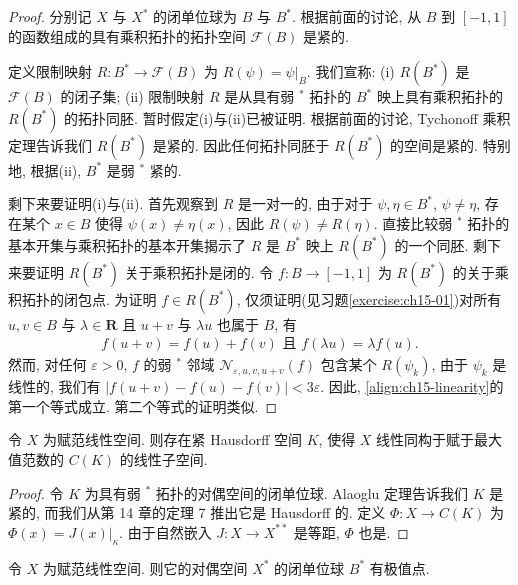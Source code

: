 \documentclass[../../main.tex]{subfiles}
\begin{document}
\begin{proof}
分别记 $X$ 与 $X^{*}$ 的闭单位球为 $B$ 与 $B^{*}$. 根据前面的讨论, 从 $B$ 到 $[-1,1]$ 的函数组成的具有乘积拓扑的拓扑空间 $\mathcal{F}(B)$ 是紧的.

定义限制映射 $R:B^{*}\to\mathcal{F}(B)$ 为 $R(\psi)=\psi|_{B}$. 我们宣称: (i) $R(B^{*})$ 是 $\mathcal{F}(B)$ 的闭子集; (ii) 限制映射 $R$ 是从具有弱 $^{*}$ 拓扑的 $B^{*}$ 映上具有乘积拓扑的 $R(B^{*})$ 的拓扑同胚. 暂时假定(i)与(ii)已被证明. 根据前面的讨论, Tychonoff 乘积定理告诉我们 $R(B^{*})$ 是紧的. 因此任何拓扑同胚于 $R(B^{*})$ 的空间是紧的. 特别地, 根据(ii), $B^{*}$ 是弱 $^{*}$ 紧的.

剩下来要证明(i)与(ii). 首先观察到 $R$ 是一对一的, 由于对于 $\psi,\eta\in B^{*}$, $\psi\neq\eta$, 存在某个 $x\in B$ 使得 $\psi(x)\neq\eta(x)$, 因此 $R(\psi)\neq R(\eta)$. 直接比较弱 $^{*}$ 拓扑的基本开集与乘积拓扑的基本开集揭示了 $R$ 是 $B^{*}$ 映上 $R(B^{*})$ 的一个同胚. 剩下来要证明 $R(B^{*})$ 关于乘积拓扑是闭的. 令 $f:B\to[-1,1]$ 为 $R(B^{*})$ 的关于乘积拓扑的闭包点. 为证明 $f\in R(B^{*})$, 仅须证明(见习题\cref{exercise:ch15-01})对所有 $u,v\in B$ 与 $\lambda\in\mathbf{R}$ 且 $u+v$ 与 $\lambda u$ 也属于 $B$, 有
\begin{align}
f(u+v)=f(u)+f(v)\text{ 且 }f(\lambda u)=\lambda f(u).\label{align:ch15-linearity}
\end{align}
然而, 对任何 $\varepsilon>0$, $f$ 的弱 $^{*}$ 邻域 $\mathcal{N}_{\varepsilon,u,v,u+v}(f)$ 包含某个 $R(\psi_{k})$, 由于 $\psi_{k}$ 是线性的, 我们有 $|f(u+v)-f(u)-f(v)|<3\varepsilon$. 因此, \eqref{align:ch15-linearity}的第一个等式成立. 第二个等式的证明类似.
\end{proof}

\begin{corollary}\label{corollary:ch15-compact-K}
令 $X$ 为赋范线性空间. 则存在紧 Hausdorff 空间 $K$, 使得 $X$ 线性同构于赋于最大值范数的 $C(K)$ 的线性子空间.
\end{corollary}

\begin{proof}
令 $K$ 为具有弱 $^{*}$ 拓扑的对偶空间的闭单位球. Alaoglu 定理告诉我们 $K$ 是紧的, 而我们从第 14 章的定理 7 推出它是 Hausdorff 的. 定义 $\Phi:X\to C(K)$ 为 $\Phi(x)=J(x)|_{\kappa}$. 由于自然嵌入 $J:X\to X^{**}$ 是等距, $\Phi$ 也是.
\end{proof}

\begin{corollary}\label{corollary:ch15-extreme-point}
令 $X$ 为赋范线性空间. 则它的对偶空间 $X^{*}$ 的闭单位球 $B^{*}$ 有极值点.
\end{corollary}
\end{document}

